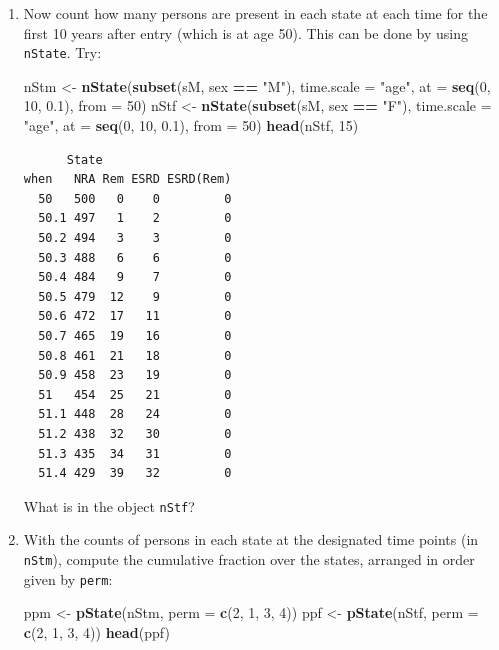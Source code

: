 \documentclass[
]{book}
\newenvironment{Shaded}{\begin{snugshade}}{\end{snugshade}}
\newcommand{\AttributeTok}[1]{\textcolor[rgb]{0.13,0.29,0.53}{#1}}
\newcommand{\DecValTok}[1]{\textcolor[rgb]{0.00,0.00,0.81}{#1}}
\newcommand{\FloatTok}[1]{\textcolor[rgb]{0.00,0.00,0.81}{#1}}
\newcommand{\FunctionTok}[1]{\textcolor[rgb]{0.13,0.29,0.53}{\textbf{#1}}}
\newcommand{\NormalTok}[1]{#1}
\newcommand{\OtherTok}[1]{\textcolor[rgb]{0.56,0.35,0.01}{#1}}
\newcommand{\SpecialCharTok}[1]{\textcolor[rgb]{0.81,0.36,0.00}{\textbf{#1}}}
\newcommand{\StringTok}[1]{\textcolor[rgb]{0.31,0.60,0.02}{#1}}
\theoremstyle{definition}
\theoremstyle{definition}
\theoremstyle{definition}
\theoremstyle{definition}
\theoremstyle{remark}
\begin{document}
\begin{enumerate}
  Why are there so many ESRD-events in the resulting data set?
\item
  Now count how many persons are present in each state
  at each time for the first 10 years after entry (which is at age 50). This
  can be done by using \texttt{nState}. Try:

\begin{Shaded}
\begin{Highlighting}[]
\NormalTok{nStm }\OtherTok{\textless{}{-}} \FunctionTok{nState}\NormalTok{(}\FunctionTok{subset}\NormalTok{(sM, sex }\SpecialCharTok{==} \StringTok{"M"}\NormalTok{), }\AttributeTok{time.scale =} \StringTok{"age"}\NormalTok{, }
               \AttributeTok{at =} \FunctionTok{seq}\NormalTok{(}\DecValTok{0}\NormalTok{, }\DecValTok{10}\NormalTok{, }\FloatTok{0.1}\NormalTok{), }
             \AttributeTok{from =} \DecValTok{50}\NormalTok{)}
\NormalTok{nStf }\OtherTok{\textless{}{-}} \FunctionTok{nState}\NormalTok{(}\FunctionTok{subset}\NormalTok{(sM, sex }\SpecialCharTok{==} \StringTok{"F"}\NormalTok{), }\AttributeTok{time.scale =} \StringTok{"age"}\NormalTok{, }
               \AttributeTok{at =} \FunctionTok{seq}\NormalTok{(}\DecValTok{0}\NormalTok{, }\DecValTok{10}\NormalTok{, }\FloatTok{0.1}\NormalTok{), }
             \AttributeTok{from =} \DecValTok{50}\NormalTok{)}
\FunctionTok{head}\NormalTok{(nStf, }\DecValTok{15}\NormalTok{)}
\end{Highlighting}
\end{Shaded}

\begin{verbatim}
      State
when   NRA Rem ESRD ESRD(Rem)
  50   500   0    0         0
  50.1 497   1    2         0
  50.2 494   3    3         0
  50.3 488   6    6         0
  50.4 484   9    7         0
  50.5 479  12    9         0
  50.6 472  17   11         0
  50.7 465  19   16         0
  50.8 461  21   18         0
  50.9 458  23   19         0
  51   454  25   21         0
  51.1 448  28   24         0
  51.2 438  32   30         0
  51.3 435  34   31         0
  51.4 429  39   32         0
\end{verbatim}

  What is in the object \texttt{nStf}?
\item
  With the counts of persons in each state at the
  designated time points (in \texttt{nStm}), compute the cumulative
  fraction over the states, arranged in order given by \texttt{perm}:

\begin{Shaded}
\begin{Highlighting}[]
\NormalTok{ppm }\OtherTok{\textless{}{-}} \FunctionTok{pState}\NormalTok{(nStm, }\AttributeTok{perm =} \FunctionTok{c}\NormalTok{(}\DecValTok{2}\NormalTok{, }\DecValTok{1}\NormalTok{, }\DecValTok{3}\NormalTok{, }\DecValTok{4}\NormalTok{))}
\NormalTok{ppf }\OtherTok{\textless{}{-}} \FunctionTok{pState}\NormalTok{(nStf, }\AttributeTok{perm =} \FunctionTok{c}\NormalTok{(}\DecValTok{2}\NormalTok{, }\DecValTok{1}\NormalTok{, }\DecValTok{3}\NormalTok{, }\DecValTok{4}\NormalTok{))}
\FunctionTok{head}\NormalTok{(ppf)}
\end{Highlighting}
\end{Shaded}


\end{enumerate}
\end{document}
